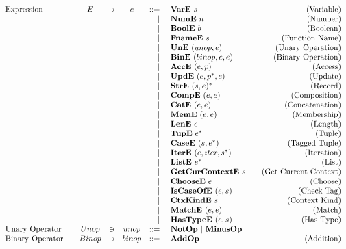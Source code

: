 \begin{align*}
\begin{array}{lcccrlr}
%
  \text{Expression}\quad& E &\ni& e &::=& ~ \vare ~ s &\quad\text{(Variable)} \\
    &&&& | & ~ \nume ~ n &\quad\text{(Number)} \\
    &&&& | & ~ \boole ~ b &\quad\text{(Boolean)} \\
    &&&& | & ~ \fnamee ~ s &\quad\text{(Function Name)} \\
    &&&& | & ~ \une ~ (unop, e) &\quad\text{(Unary Operation)} \\
    &&&& | & ~ \bine ~ (binop, e, e) &\quad\text{(Binary Operation)} \\
    &&&& | & ~ \acce ~ (e, p) &\quad\text{(Access)} \\
    &&&& | & ~ \upde ~ (e, \seq{p}, e) &\quad\text{(Update)} \\
    &&&& | & ~ \stre ~ \seq{(s, e)} &\quad\text{(Record)} \\
    &&&& | & ~ \compe ~ (e, e) &\quad\text{(Composition)} \\
    &&&& | & ~ \cate ~ (e, e) &\quad\text{(Concatenation)} \\
    &&&& | & ~ \meme ~ (e, e) &\quad\text{(Membership)} \\
    &&&& | & ~ \lene ~ e &\quad\text{(Length)} \\
    &&&& | & ~ \tupe ~ \seq e &\quad\text{(Tuple)} \\
    &&&& | & ~ \casee ~ (s, \seq e) &\quad\text{(Tagged Tuple)} \\
    &&&& | & ~ \itere ~ (e, iter, \seq{s}) &\quad\text{(Iteration)} \\
    &&&& | & ~ \liste ~ \seq e &\quad\text{(List)} \\
    &&&& | & ~ \getcurctxe ~ s &\quad\text{(Get Current Context)} \\
    &&&& | & ~ \choosee ~ e &\quad\text{(Choose)} \\
    &&&& | & ~ \iscaseofe ~ (e, s) &\quad\text{(Check Tag)} \\
    &&&& | & ~ \ctxkinde ~ s &\quad\text{(Context Kind)} \\
    &&&& | & ~ \matche ~ (e, e) &\quad\text{(Match)} \\
    &&&& | & ~ \hastypee ~ (e, s) &\quad\text{(Has Type)} \\
%
  \text{Unary Operator}\quad& Unop &\ni& unop &::=& ~ \notop ~ | ~ \minusop \\
  \text{Binary Operator}\quad& Binop &\ni& binop &::=& ~ \addop &\quad\text{(Addition)} \\

\end{array}
\end{align*}
